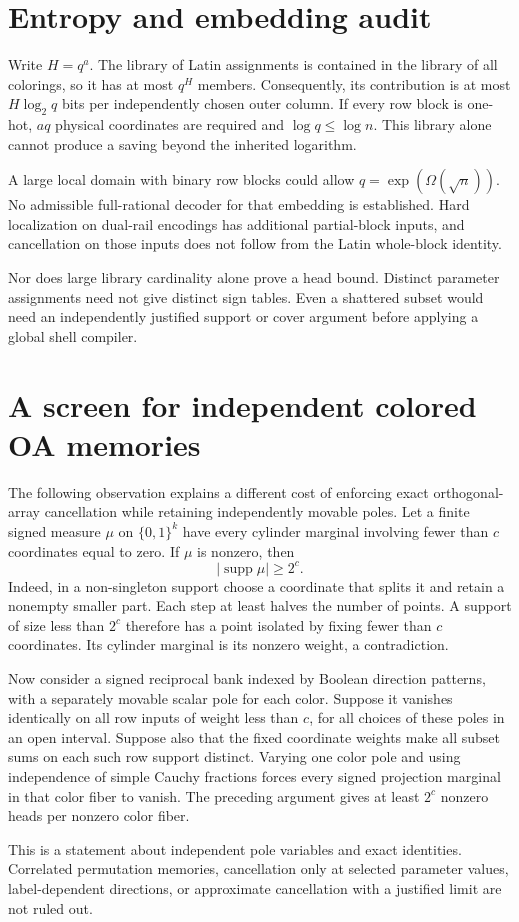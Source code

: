 \documentclass[11pt]{article}
\begin{document}
\section{Entropy and embedding audit}
Write $H=q^a$. The library of Latin assignments is contained in the
library of all colorings, so it has at most $q^H$ members. Consequently,
its contribution is at most $H\log_2q$ bits per independently chosen
outer column. If every row block is one-hot, $aq$ physical coordinates
are required and $\log q\leq\log n$. This library alone cannot produce
a saving beyond the inherited logarithm.

A large local domain with binary row blocks could allow
$q=\exp(\Omega(\sqrt n))$. No admissible full-rational decoder for that
embedding is established. Hard localization on dual-rail encodings has
additional partial-block inputs, and cancellation on those inputs does
not follow from the Latin whole-block identity.

Nor does large library cardinality alone prove a head bound. Distinct
parameter assignments need not give distinct sign tables. Even a
shattered subset would need an independently justified support or cover
argument before applying a global shell compiler.

\section{A screen for independent colored OA memories}
The following observation explains a different cost of enforcing exact
orthogonal-array cancellation while retaining independently movable
poles. Let a finite signed measure $\mu$ on $\{0,1\}^k$ have every
cylinder marginal involving fewer than $c$ coordinates equal to zero.
If $\mu$ is nonzero, then
\[
 |\operatorname{supp}\mu|\geq2^c.
\]
Indeed, in a non-singleton support choose a coordinate that splits it
and retain a nonempty smaller part. Each step at least halves the
number of points. A support of size less than $2^c$ therefore has a
point isolated by fixing fewer than $c$ coordinates. Its cylinder
marginal is its nonzero weight, a contradiction.

Now consider a signed reciprocal bank indexed by Boolean direction
patterns, with a separately movable scalar pole for each color. Suppose
it vanishes identically on all row inputs of weight less than $c$, for
all choices of these poles in an open interval. Suppose also that the
fixed coordinate weights make all subset sums on each such row support
distinct. Varying one color pole and using independence of simple Cauchy
fractions forces every signed projection marginal in that color fiber
to vanish. The preceding argument gives at least $2^c$ nonzero heads
per nonzero color fiber.

This is a statement about independent pole variables and exact
identities. Correlated permutation memories, cancellation only at
selected parameter values, label-dependent directions, or approximate
cancellation with a justified limit are not ruled out.
\end{document}
